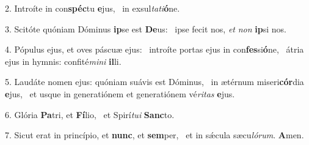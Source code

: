 2. Introíte in con\textbf{spéc}tu \textbf{e}jus, \ast\  in exsul\textit{ta}\textit{ti}\textbf{ó}ne.\

3. Scitóte quóniam Dóminus \textbf{ip}se est \textbf{De}us: \ast\  ipse fecit nos, \textit{et} \textit{non} \textbf{ip}si nos.\

4. Pópulus ejus, et oves páscuæ ejus: \dag\  introíte portas ejus in con\textbf{fes}si\textbf{ó}ne, \ast\  átria ejus in hymnis: confité\textit{mi}\textit{ni} \textbf{il}li.\

5. Laudáte nomen ejus: quóniam suávis est Dóminus, \dag\  in ætérnum miseri\textbf{cór}dia \textbf{e}jus, \ast\  et usque in generatiónem et generatiónem vé\textit{ri}\textit{tas} \textbf{e}jus.\

6. Glória \textbf{Pa}tri, et \textbf{Fí}lio, \ast\  et Spirí\textit{tu}\textit{i} \textbf{Sanc}to.\

7. Sicut erat in princípio, et \textbf{nunc}, et \textbf{sem}per, \ast\  et in sǽcula sæcu\textit{ló}\textit{rum}. \textbf{A}men.\


